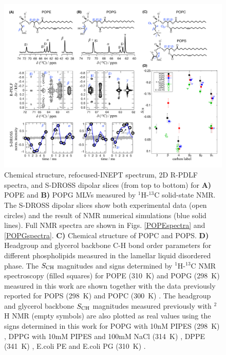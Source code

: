 \documentclass[aps,prl,superscriptaddress,twocolumn]{revtex4}
\begin{document}
\begin{figure}[]
  \centering
   \includegraphics[width=18.0cm]{./Figs/figure_PG_PE.pdf}
   \caption{\label{HGorderParameters}
     Chemical structure, refocused-INEPT spectrum, 2D R-PDLF spectra, and S-DROSS dipolar slices (from top to bottom) for \textbf{A)} POPE  and \textbf{B)} POPG MLVs measured by $^1$H-$^{13}$C solid-state NMR. The S-DROSS dipolar slices show both experimental data (open circles) and the result of NMR numerical simulations (blue solid lines).
      Full NMR spectra are shown in Figs. \ref{POPEspectra} and \ref{POPGspectra}.
     \textbf{C)} Chemical structure of POPC and POPS.
    \textbf{D)} Headgroup and glycerol backbone C-H bond order parameters for different phospholipids measured in the lamellar liquid disordered phase.
    The $S_{\rm{CH}}$ magnitudes and signs determined by $^1$H-$^{13}$C NMR spectroscopy (filled squares) for POPE (310~K) and POPG (298~K)
    measured in this work are shown together with the data previously reported for POPS (298~K) \cite{antila19} and POPC (300~K) \cite{ferreira13,ferreira16}. The headgroup and glycerol backbone $S_{\rm{CH}}$ magnitudes measured previously with $^2$H NMR (empty symbols) are also plotted as real values using the signs determined in this work for 
    POPG with 10nM PIPES (298~K) \cite{borle85},
    DPPG with 10mM PIPES and 100mM NaCl (314~K) \cite{wohlgemuth80}, 
    DPPE (341~K) \cite{seelig76},
    E.coli PE and E.coli PG (310~K) \cite{gally81}
    .
   }
\end{figure}
\end{document}
